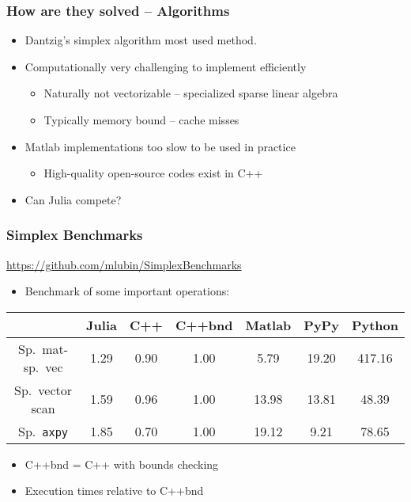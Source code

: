 \documentclass{beamer}
\begin{document}
\begin{frame}
	\frametitle{How are they solved -- Algorithms}
	\begin{itemize}
		\item Dantzig's simplex algorithm most used method.
		\item Computationally very challenging to implement efficiently
		\begin{itemize}
			\item Naturally not vectorizable -- specialized sparse linear algebra
			\item Typically memory bound -- cache misses
		\end{itemize}
		\item Matlab implementations too slow to be used in practice
		\begin{itemize}
			\item High-quality open-source codes exist in C++
		\end{itemize}
		\item Can Julia compete?
	\end{itemize}
\end{frame}

\begin{frame}
	\frametitle{Simplex Benchmarks}
	\begin{center}
		\url{https://github.com/mlubin/SimplexBenchmarks}
	\end{center}
	\begin{itemize}
		\item Benchmark of some important operations:
	\end{itemize}
\begin{table}\begin{center}
\begin{tabular}{|c|c|c|c|c|c|c|}
\hline
		       & Julia  & C++  &   C++bnd  &Matlab & PyPy &   Python  \\
\hline
Sp.\ mat-sp.\ vec& 1.29  &  0.90  &  1.00  &  5.79 &   19.20 &  417.16\\ 
Sp.\ vector scan &  1.59  &  0.96 &   1.00  &  13.98 &  13.81 &  48.39\\
Sp.\ \texttt{axpy}& 1.85  &  0.70  &  1.00  &  19.12  & 9.21  &  78.65\\
\hline
\end{tabular}\end{center}
\end{table}
	\begin{itemize}
		\item C++bnd = C++ with bounds checking
		\item Execution times relative to C++bnd
	\end{itemize}
\end{frame}
\end{document}
